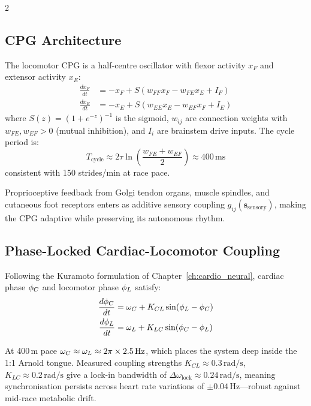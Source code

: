 \begin{multicols}{2}

\subsection{CPG Architecture}

The locomotor CPG is a half-centre oscillator with flexor activity $x_F$ and extensor activity $x_E$:
\begin{align}
\frac{dx_F}{dt} &= -x_F + S(w_{FF}x_F - w_{FE}x_E + I_F) \\
\frac{dx_E}{dt} &= -x_E + S(w_{EE}x_E - w_{EF}x_F + I_E)
\end{align}
where $S(z) = (1 + e^{-z})^{-1}$ is the sigmoid, $w_{ij}$ are connection weights with $w_{FE}, w_{EF} > 0$ (mutual inhibition), and $I_i$ are brainstem drive inputs. The cycle period is:
\begin{equation}
T_{\mathrm{cycle}} \approx 2\tau\ln\!\left(\frac{w_{FE}+w_{EF}}{2}\right) \approx 400\,\mathrm{ms}
\end{equation}
consistent with 150 strides/min at race pace.

Proprioceptive feedback from Golgi tendon organs, muscle spindles, and cutaneous foot receptors enters as additive sensory coupling $g_{ij}(\mathbf{s}_{\mathrm{sensory}})$, making the CPG adaptive while preserving its autonomous rhythm.

\subsection{Phase-Locked Cardiac-Locomotor Coupling}

Following the Kuramoto formulation of Chapter~\ref{ch:cardio_neural}, cardiac phase $\phi_C$ and locomotor phase $\phi_L$ satisfy:
\begin{align}
\frac{d\phi_C}{dt} &= \omega_C + K_{CL}\sin(\phi_L - \phi_C) \\
\frac{d\phi_L}{dt} &= \omega_L + K_{LC}\sin(\phi_C - \phi_L)
\end{align}

At 400\,m pace $\omega_C \approx \omega_L \approx 2\pi \times 2.5\,\mathrm{Hz}$, which places the system deep inside the 1:1 Arnold tongue. Measured coupling strengths $K_{CL} \approx 0.3\,\mathrm{rad/s}$, $K_{LC} \approx 0.2\,\mathrm{rad/s}$ give a lock-in bandwidth of $\Delta\omega_{\mathrm{lock}} \approx 0.24\,\mathrm{rad/s}$, meaning synchronisation persists across heart rate variations of $\pm 0.04\,\mathrm{Hz}$---robust against mid-race metabolic drift.


\end{multicols}
